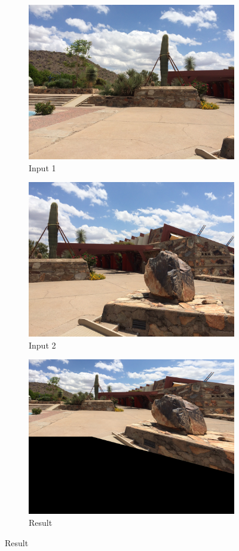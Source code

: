 \documentclass[a4paper,11]{article}
\begin{document}
  \begin{figure}[H]
    \begin{subfigure}{.5\textwidth}
      \centering
      \includegraphics[width=.8\linewidth]{img3_1}
      \caption{Input 1}
    \end{subfigure}
    \begin{subfigure}{.5\textwidth}
      \centering
      \includegraphics[width=.8\linewidth]{img3_2}
      \caption{Input 2}
    \end{subfigure}
    \begin{subfigure}{\textwidth}
      \centering
      \includegraphics[width=.8\linewidth]{mosaic3}
      \caption{Result}
    \end{subfigure}
  \end{figure}
\end{document}
